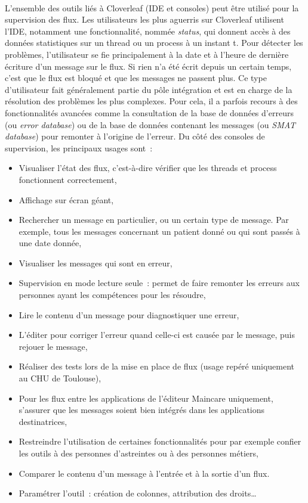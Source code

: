 			\paragraph{}%
			L’ensemble des outils liés à Cloverleaf (IDE et consoles)
			peut être utilisé pour la supervision des flux. Les utilisateurs les plus
			aguerris sur Cloverleaf utilisent l’IDE, notamment une fonctionnalité,
			nommée \textit{status}, qui donnent accès à des données statistiques sur un
			thread ou un process à un instant t. Pour détecter les problèmes,
			l’utilisateur se fie principalement à la date et à l'heure de dernière
			écriture d’un message sur le flux. Si rien n’a été écrit depuis un certain temps, c’est que
			le flux est bloqué et que les messages ne passent plus. Ce type d’utilisateur
			fait généralement partie du pôle intégration et est en charge de la
			résolution des problèmes les plus complexes.
			Pour cela, il a parfois recours à des fonctionnalités avancées comme la
			consultation de la base de données d'erreurs (ou \textit{error database}) ou
			de la base de données contenant les messages (ou \textit{SMAT database})
			pour remonter à l’origine de l’erreur.\newline
			Du côté des consoles de supervision, les principaux usages sont~:
			\begin{itemize}
			  \item Visualiser l’état des flux, c'est-à-dire vérifier que les threads et
			  process fonctionnent correctement,
			  \item Affichage sur écran géant,
			  \item Rechercher un message en particulier, ou un certain type de
			  message. Par exemple, tous les messages concernant un patient donné ou
			  qui sont passés à une date donnée,
			  \item Visualiser les messages qui sont en erreur,
			  \item Supervision en mode lecture seule~: permet de faire remonter les
			  erreurs aux personnes ayant les compétences pour les résoudre,
			  \item Lire le contenu d'un message pour diagnostiquer une erreur,
			  \item L'éditer pour corriger l'erreur quand celle-ci est causée par le
			  message, puis rejouer le message,
			  \item Réaliser des tests lors de la mise en place de flux (usage repéré
			  uniquement au CHU de Toulouse),
			  \item Pour les flux entre les applications de l'éditeur Maincare
			  uniquement, s’assurer que les messages soient bien intégrés dans les
			  applications destinatrices,
			  \item Restreindre l’utilisation de certaines fonctionnalités pour par
			  exemple confier les outils à des personnes d’astreintes ou à des personnes
			  métiers,
			  \item Comparer le contenu d’un message à l'entrée et à la sortie d'un flux.
			  \item Paramétrer l’outil~: création de colonnes, attribution des droits…
			\end{itemize}
